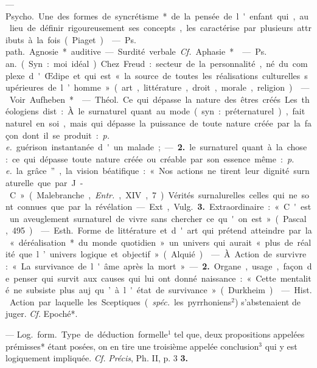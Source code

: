 \begin{itemize}[leftmargin=1cm, label=, itemsep=1pt]
 — \si{Psycho.} Une des
formes de syncrétisme* de la pensée
de l'enfant qui, au lieu de définir
rigoureusement ses concepts, les
caractérise par plusieurs attributs à
la fois (Piaget).

 — \si{Ps. path.} Agnosie* auditive. — Surdité verbale. {\it Cf.}
Aphasie*.

 — \si{Ps. an.} (Syn. : moi idéal).
Chez Freud : secteur de la personnalité, né du complexe d'Œdipe et
qui est « la source de toutes les réalisations culturelles supérieures de
l’homme » (art, littérature, droit,
morale, religion).

 — Voir Aufheben*.

 — \si{Théol.} Ce qui dépasse
la nature des êtres créés. Les théologiens dist. : À. le surnaturel quant
au mode (syn. : préternaturel), fait
naturel en soi, mais qui dépasse la
puissance de toute nature créée
par la façon dont il se produit : {\it p. e.}
guérison instantanée d'un malade;
— {\bf 2.} le surnaturel quant à la chose :
ce qui dépasse toute nature créée ou
créable par son essence même : {\it p. e.}
la grâce”, la vision béatifique : « Nos
actions ne tirent leur dignité surnaturelle que par J.-C. » (Malebranche, {\it Entr.}, XIV, 7). Vérités
surnalurelles celles qui ne sont
connues que par la révélation.

— Ext, \si{Vulg.} {\bf 3.} Extraordinaire :
« C'est un aveuglement surnaturel
de vivre sans chercher ce qu'on est »
(Pascal, 495).

 — \si{Esth.} Forme de littérature et d'art qui prétend atteindre
par la « déréalisation* du monde
quotidien » un univers qui aurait
« plus de réalité que l’univers logique et objectif » (Alquié).

 — À. Action de survivre :
« La survivance de l'âme après la
mort » — {\bf 2.} Organe, usage, façon
de penser qui survit aux causes qui
lui ont donné naissance : « Cette
mentalité ne subsiste plus auj. qu’à
l'état de survivance » (Durkheim).

 — \si{Hist.}
Action par laquelle les Sceptiques
({\it spéc.} les pyrrhoniens$^2$) s’abstenaient de juger. {\it Cf.} Epoché*.

 — \si{Log.} \si{form.} Type de
déduction formelle$^1$ tel que, deux
propositions appelées prémisses*
étant posées, on en tire une troisième appelée conclusion$^3$ qui y est
logiquement impliquée. {\it Cf.} {\it Précis},
Ph. II, p. 3 {\bf 3.}


\end{itemize}
